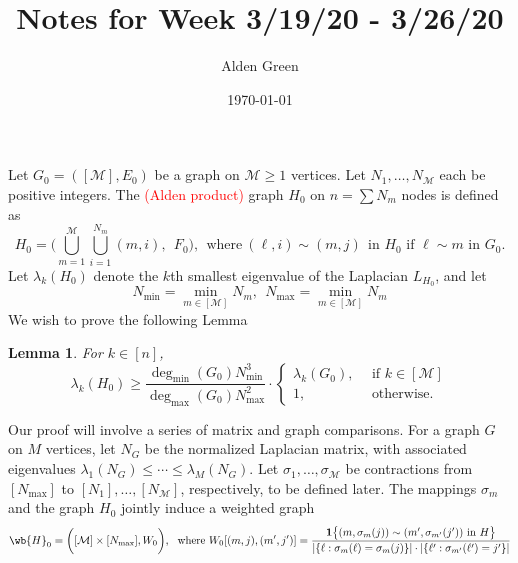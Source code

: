 \documentclass{article}
\newcommand{\1}{\mathbf{1}}
\newcommand{\mc}[1]{\mathcal{#1}}
\theoremstyle{alden}
\theoremstyle{aldenthm}
\newtheorem{lemma}{Lemma}
\theoremstyle{definition}
\theoremstyle{remark}
\begin{document}
\title{Notes for Week 3/19/20 - 3/26/20}
\author{Alden Green}
\date{\today}
\maketitle

Let $G_0 = ([\mc{M}],E_0)$ be a graph on $\mc{M} \geq 1$ vertices. Let $N_1, \ldots, N_{\mc{M}}$ each be positive integers. The \textcolor{red}{(Alden product)} graph $H_0$ on $n = \sum N_m$ nodes is defined as
\begin{equation*}
H_0 = \biggl(\bigcup_{m = 1}^{\mc{M}} \bigcup_{i = 1}^{N_m} (m,i),~~ F_0\biggr),~~\textrm{where}~ (\ell,i) \sim (m,j)~~\textrm{in $H_0$ if $\ell \sim m$ in $G_0$.}  
\end{equation*}
Let $\lambda_k(H_0)$ denote the $k$th smallest eigenvalue of the Laplacian $L_{H_0}$, and let
\begin{equation*}
N_{\min} = \min_{m \in [\mc{M}]} N_m,~~N_{\max} = \min_{m \in [\mc{M}]} N_m
\end{equation*} We wish to prove the following Lemma
\begin{lemma}
	\label{lem:alden_product_eigenvalues}
	For $k \in [n]$,
	\begin{equation}
	\label{eqn:alden_product_eigenvalue}
	\lambda_k(H_0) \geq \frac{\deg_{\min}(G_0)N_{\min}^3}{\deg_{\max}(G_0)N_{\max}^2}  \cdot
	\begin{cases}
	\lambda_k(G_0),& ~~\textrm{if $k \in [\mc{M}]$} \\
	1,& ~~\textrm{otherwise.}
	\end{cases}
	\end{equation}
\end{lemma}

Our proof will involve a series of matrix and graph comparisons. For a graph $G$ on $M$ vertices, let $N_G$ be the normalized Laplacian matrix, with associated eigenvalues $\lambda_1(N_G) \leq \cdots \leq \lambda_M(N_G)$. Let  $\sigma_1,\ldots,\sigma_{\mc{M}}$ be contractions from $[N_{\max}]$ to $[N_{1}],\ldots,[N_{\mc{M}}]$, respectively, to be defined later. The mappings $\sigma_m$ and the graph $H_0$ jointly induce a weighted graph 
\begin{equation}
\label{eqn:alden_product_eigenvalue_0}
\wb{H}_0 = \biggl([\mc{M}] \times [N_{\max}], W_0\biggr),~~ \textrm{where $W_0[(m,j),(m',j')] = \frac{ \1\bigl\{(m,\sigma_m(j)) \sim (m',\sigma_{m'}(j'))~\textrm{in $H$} \bigr\}}{|\{\ell:\sigma_m(\ell) = \sigma_m(j)\}| \cdot |\{\ell':\sigma_{m'}(\ell') = j' \}|}$}
\end{equation}
\end{document}
